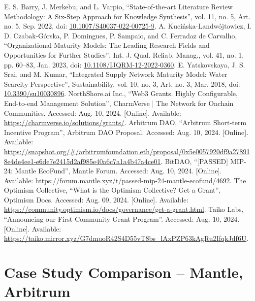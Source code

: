 \documentclass[a4,10pt]{article}
\begin{document}
\begin{thebibliography}{00}
 E. S. Barry, J. Merkebu, and L. Varpio, ``State-of-the-art Literature Review Methodology: A Six-Step Approach for Knowledge Synthesis'', vol. 11, no. 5, Art. no. 5, Sep. 2022, doi: \href{https://doi.org/10.1007/S40037-022-00725-9}{10.1007/S40037-022-00725-9}.
 A. Kucińska-Landwójtowicz, I. D. Czabak-Górska, P. Domingues, P. Sampaio, and C. Ferradaz de Carvalho, ``Organizational Maturity Models: The Leading Research Fields and Opportunities for Further Studies'', Int. J. Qual. Reliab. Manag., vol. 41, no. 1, pp. 60--83, Jan. 2023, doi: \href{https://doi.org/10.1108/IJQRM-12-2022-0360}{10.1108/IJQRM-12-2022-0360}.
 E. Yatskovskaya, J. S. Srai, and M. Kumar, ``Integrated Supply Network Maturity Model: Water Scarcity Perspective'', Sustainability, vol. 10, no. 3, Art. no. 3, Mar. 2018, doi: \href{https://doi.org/10.3390/su10030896}{10.3390/su10030896}.
 NorthShore.ai Inc., ``Web3 Grants. Highly Configurable, End-to-end Management Solution'', CharmVerse | The Network for Onchain Communities. Accessed: Aug. 10, 2024. [Online]. Available: \href{https://charmverse.io/solutions/grants/}{https://charmverse.io/solutions/grants/}.
 Arbitrum DAO, ``Arbitrum Short-term Incentive Program'', Arbitrum DAO Proposal. Accessed: Aug. 10, 2024. [Online]. Available: \href{https://snapshot.org/\#/arbitrumfoundation.eth/proposal/0x5e0057920df9a278918e4de4ee1e6de7e2415d2af985e40a6c7a1a4b47a4ce01}{https://snapshot.org/\#/arbitrumfoundation.eth/proposal/0x5e0057920df9a278918e4de4ee1-e6de7e2415d2af985e40a6c7a1a4b47a4ce01}.
 BitDAO, ``[PASSED] MIP-24: Mantle EcoFund'', Mantle Forum. Accessed: Aug. 10, 2024. [Online]. Available: \href{https://forum.mantle.xyz/t/passed-mip-24-mantle-ecofund/4692}{https://forum.mantle.xyz/t/passed-mip-24-mantle-ecofund/4692}.
 The Optimism Collective, ``What is the Optimism Collective? Get a Grant'', Optimism Docs. Accessed: Aug. 09, 2024. [Online]. Available: \href{https://community.optimism.io/docs/governance/get-a-grant.html}{https://community.optimism.io/docs/governance/get-a-grant.html}.
 Taiko Labs, ``Announcing our First Community Grant Program''. Accessed: Aug. 10, 2024. [Online]. Available: \href{https://taiko.mirror.xyz/G7dmuoR42S4D55vT8bs_lAxPZP63kAgRu2IfqkJdf6U}{https://taiko.mirror.xyz/G7dmuoR42S4D55vT8bs\_lAxPZP63kAgRu2IfqkJdf6U}.

\end{thebibliography}
\newpage
{}
\appendix
\section{Case Study Comparison -- Mantle, Arbitrum}\label{sec_15}
\end{document}
